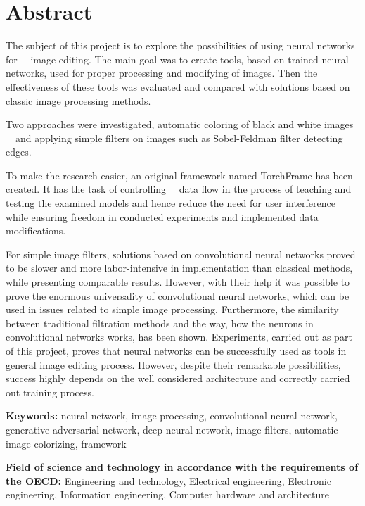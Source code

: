 \section*{Abstract}

  The subject of this project is to explore the possibilities of using neural networks for
  image editing. The main goal was to create tools, based on
  trained neural networks, used for proper processing and modifying of
  images. Then the effectiveness of these tools was evaluated and
  compared with solutions based on classic image processing methods.

  Two approaches were investigated, automatic coloring of black and white images
  and applying simple filters on images such as Sobel-Feldman filter detecting edges.

  To make the research easier, an original framework named TorchFrame has been created.
  It has the task of controlling
  data flow in the process of teaching and testing the examined models and hence
  reduce the need for user interference while ensuring freedom
  in conducted experiments and implemented data modifications.

  For simple image filters, solutions based on convolutional neural networks proved to
  be slower and more labor-intensive in implementation than classical methods,
  while presenting comparable results.
  However, with their help it was possible to prove the enormous universality
  of convolutional neural networks, which can be used in issues related to
  simple image processing. Furthermore, the similarity between traditional filtration
  methods and the way, how the neurons in convolutional networks works, has been shown.
  Experiments, carried out as part of this project, proves that neural networks can
  be successfully used as tools in general image editing process. However, despite
  their remarkable possibilities, success highly depends on the well considered
  architecture and correctly carried out training process.

  \bigskip

  \noindent\textbf{Keywords:} neural network, image processing, convolutional
  neural network, generative adversarial network, deep neural network,
  image filters, automatic image colorizing, framework

  \bigskip

  \noindent\textbf{Field of science and technology in accordance with the
  requirements of the OECD:} Engineering and technology, Electrical engineering,
  Electronic engineering, Information engineering, Computer hardware and
  architecture
